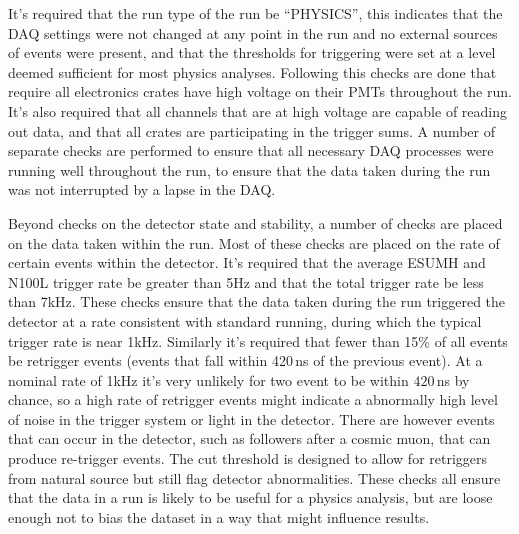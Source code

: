 It's required that the run type of the run be ``PHYSICS'', this indicates
that the DAQ settings were not changed at any point in the run and no external
sources of events were present, and that the thresholds for triggering were set
at a level deemed sufficient for most physics analyses.
Following this checks are done
that require all electronics crates have high voltage on their PMTs throughout
the run.
It's also required that all channels that are at high voltage are capable of
reading out data, and that all crates are participating in the trigger sums.
A number of separate checks are performed to ensure that all necessary DAQ
processes were running well throughout the run, to ensure that the data taken
during the run was not interrupted by a lapse in the DAQ.\@

Beyond checks on the detector state and stability, a number of checks
are placed on the data taken within the run.
Most of these checks are placed on the rate of certain events within the detector.
It's required that the average ESUMH and N100L trigger rate be greater than 5Hz and
that the total trigger rate be less than 7kHz.
These checks ensure that the data taken during the run triggered the detector
at a rate consistent with standard running, during which the typical trigger
rate is near 1kHz.
Similarly it's required that fewer than 15\% of all events be retrigger events
(events that fall within 420\,ns of the previous event).
At a nominal rate of 1kHz it's very unlikely for two event to be within $420$\,ns
by chance, so a high rate of retrigger events might indicate a abnormally
high level of noise in the trigger system or light in the detector.
There are however events that can occur
in the detector, such as followers after a cosmic muon, that can produce
re-trigger events.
The cut threshold is designed to allow for retriggers from natural source but
still flag detector abnormalities.
These checks all ensure that the data in a run is likely to be useful for
a physics analysis, but are loose enough not to bias the dataset in a way that
might influence results.

